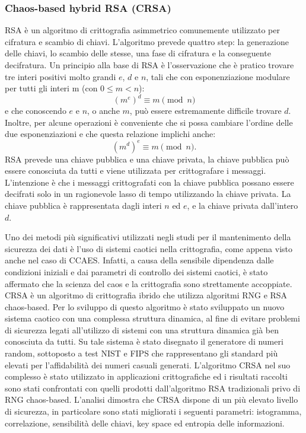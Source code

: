 \subsubsection{Chaos-based hybrid RSA (CRSA)}
RSA è un algoritmo di crittografia asimmetrico comunemente utilizzato per cifratura e scambio di chiavi. L'algoritmo prevede quattro step: la generazione delle chiavi, lo scambio delle stesse, una fase di cifratura e la conseguente decifratura. Un principio alla base di RSA è l'osservazione che è pratico trovare tre interi positivi molto grandi $e$, $d$ e $n$, tali che con esponenziazione modulare per tutti gli interi m (con $0 \le m < n$):
\begin{equation}
    (m^{e})^{d}\equiv m{\pmod {n}}
\end{equation}
e che conoscendo $e$ e $n$, o anche $m$, può essere estremamente difficile trovare $d$. Inoltre, per alcune operazioni è conveniente che si possa cambiare l'ordine delle due esponenziazioni e che questa relazione implichi anche:
\begin{equation}
    (m^{d})^{e}\equiv m{\pmod {n}}.
\end{equation}
RSA prevede una chiave pubblica e una chiave privata, la chiave pubblica può essere conosciuta da tutti e viene utilizzata per crittografare i messaggi. L'intenzione è che i messaggi crittografati con la chiave pubblica possano essere decifrati solo in un ragionevole lasso di tempo utilizzando la chiave privata. La chiave pubblica è rappresentata dagli interi $n$ ed $e$, e la chiave privata dall'intero $d$. 

Uno dei metodi più significativi utilizzati negli studi per il mantenimento della sicurezza dei dati è l'uso di sistemi caotici nella crittografia, come appena visto anche nel caso di CCAES. Infatti, a causa della sensibile dipendenza dalle condizioni iniziali e dai parametri di controllo dei sistemi caotici, è stato affermato che la scienza del caos e la crittografia sono strettamente accoppiate. CRSA \cite{cavusoglu_design_2017} è un algoritmo di crittografia ibrido che utilizza algoritmi RNG e RSA chaos-based. Per lo sviluppo di questo algoritmo è stato sviluppato un nuovo sistema caotico con una complessa struttura dinamica, al fine di evitare problemi di sicurezza legati all'utilizzo di sistemi con una struttura dinamica già ben conosciuta da tutti. Su tale sistema è stato disegnato il generatore di numeri random, sottoposto a test NIST e FIPS \cite{cavusoglu_design_2017} che rappresentano gli standard più elevati per l'affidabilità dei numeri casuali generati. L'algoritmo CRSA nel suo complesso è stato utilizzato in applicazioni crittografiche ed i risultati raccolti sono stati confrontati con quelli prodotti dall'algoritmo RSA tradizionali privo di RNG chaos-based. L'analisi \cite{cavusoglu_design_2017} dimostra che CRSA dispone di un più elevato livello di sicurezza, in particolare sono stati migliorati i seguenti parametri: istogramma, correlazione, sensibilità delle chiavi, key space ed entropia delle informazioni. 

